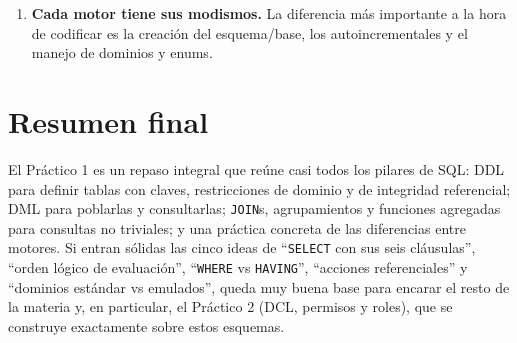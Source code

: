\documentclass[11pt,a4paper]{article}
\begin{document}
\begin{enumerate}
\begin{itemize}
        \item ``A sin B'' $\Rightarrow$ \texttt{NOT EXISTS} o \texttt{LEFT
        JOIN \dots\ WHERE \dots\ IS NULL}.
        \item ``Cuántos B por A'' $\Rightarrow$ \texttt{GROUP BY a} con
        \texttt{COUNT(*)}.
        \item ``A con más de $k$ B'' $\Rightarrow$ \texttt{GROUP BY a
        HAVING COUNT(*) > $k$}.
        \item ``Máx/mín por A'' $\Rightarrow$ \texttt{GROUP BY a} con
        \texttt{MAX/MIN}.
    \end{itemize}
    \item \textbf{Cada motor tiene sus modismos.} La diferencia más
    importante a la hora de codificar es la creación del esquema/base, los
    autoincrementales y el manejo de dominios y enums.
\end{enumerate}

\section*{Resumen final}

El Práctico 1 es un repaso integral que reúne casi todos los pilares de SQL:
DDL para definir tablas con claves, restricciones de dominio y de integridad
referencial; DML para poblarlas y consultarlas; \texttt{JOIN}s, agrupamientos
y funciones agregadas para consultas no triviales; y una práctica concreta de
las diferencias entre motores. Si entran sólidas las cinco ideas de
``\texttt{SELECT} con sus seis cláusulas'', ``orden lógico de evaluación'',
``\texttt{WHERE} vs \texttt{HAVING}'', ``acciones referenciales'' y
``dominios estándar vs emulados'', queda muy buena base para encarar
el resto de la materia y, en particular, el Práctico 2 (DCL, permisos y
roles), que se construye exactamente sobre estos esquemas.
\end{document}
